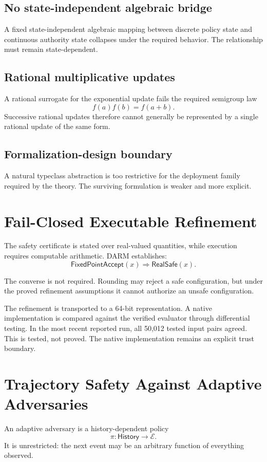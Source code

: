 \documentclass[11pt]{article}
\begin{document}
\subsection{No state-independent algebraic bridge}
A fixed state-independent algebraic mapping between discrete policy state and continuous authority state collapses under the required behavior. The relationship must remain state-dependent.

\subsection{Rational multiplicative updates}
A rational surrogate for the exponential update fails the required semigroup law
\[
f(a)f(b)=f(a+b).
\]
Successive rational updates therefore cannot generally be represented by a single rational update of the same form.

\subsection{Formalization-design boundary}
A natural typeclass abstraction is too restrictive for the deployment family required by the theory. The surviving formulation is weaker and more explicit.

\section{Fail-Closed Executable Refinement}
The safety certificate is stated over real-valued quantities, while execution requires computable arithmetic. DARM establishes:
\[
\boxed{\mathsf{FixedPointAccept}(x)\Rightarrow\mathsf{RealSafe}(x).}
\]

The converse is not required. Rounding may reject a safe configuration, but under the proved refinement assumptions it cannot authorize an unsafe configuration.

The refinement is transported to a 64-bit representation. A native implementation is compared against the verified evaluator through differential testing. In the most recent reported run, all 50,012 tested input pairs agreed. This is tested, not proved. The native implementation remains an explicit trust boundary.

\section{Trajectory Safety Against Adaptive Adversaries}
An adaptive adversary is a history-dependent policy
\[
\pi:\mathsf{History}\rightarrow\mathcal{E}.
\]
It is unrestricted: the next event may be an arbitrary function of everything observed.
\end{document}

